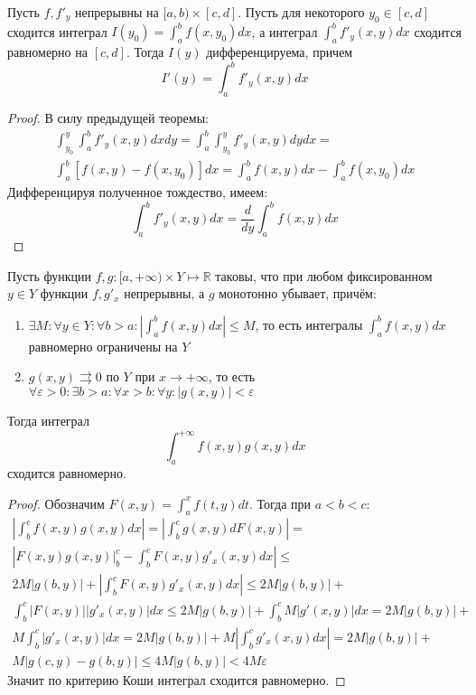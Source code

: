 \documentclass[document.tex]{subfiles}
\begin{document}
\begin{theorem}
    Пусть $f, f'_y$ непрерывны на $[a, b) \times [c, d]$. Пусть для некоторого $y_0 \in [c, d]$ сходится интеграл
    $I(y_0) = \int_{a}^{b}f(x, y_0)dx$, а интеграл $\int_{a}^{b}f'_y(x, y)dx$ сходится равномерно на $[c, d]$. Тогда
    $I(y)$ дифференцируема, причем
    \[
        I'(y) = \int_{a}^{b}f'_y(x, y)dx
    \]
\end{theorem}

\begin{proof}
    В силу предыдущей теоремы:
    \begin{multline*}
        \int_{y_0}^{y} \int_{a}^{b} f'_y(x, y)dxdy = \int_{a}^{b} \int_{y_0}^{y} f'_y(x, y)dydx = \\
        \int_{a}^{b} \left[ f(x, y) - f(x, y_0) \right] dx = \int_{a}^{b}f(x, y)dx - \int_{a}^{b}f(x, y_0)dx
    \end{multline*}
    Дифференцируя полученное тождество, имеем:
    \[
        \int_{a}^{b}f'_y(x, y)dx = \frac{d}{dy} \int_{a}^{b}f(x, y)dx
    \]
\end{proof}

\begin{theorem}
    Пусть функции $f, g: [a, +\infty) \times Y \mapsto \mathbb{R}$ таковы, что при любом фиксированном $y \in Y$ функции 
    $f, g'_x$ непрерывны, а $g$ монотонно убывает, причём:
    \begin{enumerate}
        \item $\exists M: \forall y \in Y: \forall b > a: \left| \int_{a}^{b}f(x, y)dx \right| \leq M$, то есть
            интегралы $\int_{a}^{b}f(x, y)dx$ равномерно ограничены на $Y$
        \item $g(x, y) \rightrightarrows 0$ по $Y$ при $x \rightarrow +\infty$, то есть $\forall \varepsilon > 0: \exists 
            b > a: \forall x > b: \forall y: |g(x, y)| < \varepsilon$
    \end{enumerate}
    Тогда интеграл
    \[
        \int_{a}^{+\infty}f(x, y)g(x, y)dx
    \] сходится равномерно.
\end{theorem}

\begin{proof}
    Обозначим $F(x, y) = \int_{a}^{x}f(t, y)dt$. Тогда при $a < b < c:$
    \begin{multline*}
        \left| \int_{b}^{c} f(x, y) g(x, y)dx \right| = \left| \int_{b}^{c}g(x, y) dF(x, y) \right| = \\ \left| F(x,
        y) g(x, y) \Big|_b^c - \int_{b}^{c}F(x, y) g'_x(x, y)dx \right| \leq \\ 2M|g(b, y)| + \left|
        \int_{b}^{c}F(x, y) g'_x(x, y)dx \right| \leq 2M|g(b, y)| + \\ \int_{b}^{c}|F(x, y)||g'_x(x, y)|dx \leq
        2M|g(b, y)| + \int_{b}^{c}M|g'(x, y)|dx = 2M|g(b, y)| + \\ M \int_{b}^{c}|g'_x(x, y)|dx = 2M|g(b, y)| + M
        \left|\int_{b}^{c}g'_x(x, y)dx \right| = 2M|g(b, y)| + \\ M \left| g(c, y) - g(b, y) \right| \leq 4M |g(b, y)| <
        4M \varepsilon
    \end{multline*}
    Значит по критерию Коши интеграл сходится равномерно.
\end{proof}
\end{document}
